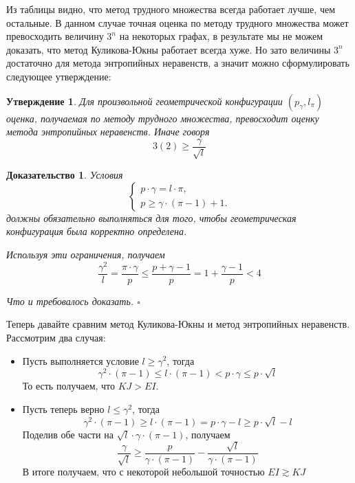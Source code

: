 \documentclass[a4paper]{article}
\newtheorem*{mclaim}{Утверждение}
\newtheorem*{msolution}{Доказательство}
\begin{document}
Из таблицы видно, что метод трудного множества всегда работает лучше, чем остальные. В данном случае 
точная оценка по методу трудного множества может превосходить величину $3^n$ на некоторых графах, в 
результате мы не можем доказать, что метод Куликова-Юкны работает всегда хуже. Но зато величины $3^n$ 
достаточно для метода энтропийных неравенств, а значит можно сформулировать следующее утверждение:

\begin{mclaim}
    Для произвольной геометрической конфигурации $(p_{\gamma}, l_{\pi})$ оценка, получаемая по методу 
    трудного множества, превосходит оценку метода энтропийных неравенств. Иначе говоря 
    $$3(2) \geq \frac{\gamma}{\sqrt{l}}$$
\end{mclaim}

\begin{msolution}
	Условия 
	\begin{equation*}
	    \begin{cases}
			p\cdot \gamma = l\cdot \pi, \\
			p \geq \gamma\cdot (\pi - 1) + 1.
		\end{cases}
	\end{equation*}
	должны обязательно выполняться для того, чтобы геометрическая конфигурация была корректно определена.
	
	Используя эти ограничения, получаем $$\frac{\gamma^2}{l} = \frac{\pi\cdot\gamma}{p} \leq \frac{p + 
	\gamma - 1}{p} = 1 + \frac{\gamma - 1}{p} < 4$$
	
	Что и требовалось доказать. $\square$
\end{msolution}

Теперь давайте сравним метод Куликова-Юкны и метод энтропийных неравенств. Рассмотрим два случая:
\begin{itemize}
    \item Пусть выполняется условие $l \geq \gamma^2$, тогда $$\gamma^2 \cdot (\pi - 1) \leq l \cdot (\pi - 1) 
    < p\cdot\gamma \leq p\cdot\sqrt{l}$$ То есть получаем, что $KJ > EI$.
    \item Пусть теперь верно $l \leq \gamma^2$, тогда $$\gamma^2\cdot (\pi - 1) \geq l\cdot(\pi - 1) = 
    p\cdot\gamma - l \geq p\cdot\sqrt{l} - l$$ Поделив обе части на $\sqrt{l}\cdot\gamma\cdot(\pi -1)$, 
    получаем $$\frac{\gamma}{\sqrt{l}} \geq \frac{p}{\gamma\cdot(\pi - 1)} - \frac{\sqrt{l}}{\gamma\cdot(\pi-1)}$$
	В итоге получаем, что с некоторой небольшой точностью $EI \gtrsim KJ$
\end{itemize}
\end{document}

